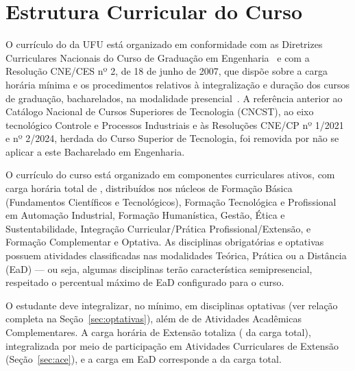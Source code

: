 \chapter{Estrutura Curricular do Curso}
\label{chp:estrutura_curricular}

O currículo do \ppccurso da UFU está organizado em conformidade com as Diretrizes Curriculares Nacionais do Curso de Graduação em Engenharia~\cite{cne_ces_2_2019,cne_ces_1_2021} e com a Resolução CNE/CES nº 2, de 18 de junho de 2007, que dispõe sobre a carga horária mínima e os procedimentos relativos à integralização e duração dos cursos de graduação, bacharelados, na modalidade presencial~\cite{cne_ces_2_2007}. A referência anterior ao Catálogo Nacional de Cursos Superiores de Tecnologia (CNCST), ao eixo tecnológico Controle e Processos Industriais e às Resoluções CNE/CP nº 1/2021 e nº 2/2024, herdada do Curso Superior de Tecnologia, foi removida por não se aplicar a este Bacharelado em Engenharia.

O currículo do curso está organizado em  componentes curriculares ativos, com carga horária total de \textbf{}, distribuídos nos núcleos de Formação Básica (Fundamentos Científicos e Tecnológicos), Formação Tecnológica e Profissional em Automação Industrial, Formação Humanística, Gestão, Ética e Sustentabilidade, Integração Curricular/Prática Profissional/Extensão, e Formação Complementar e Optativa. As disciplinas obrigatórias e optativas possuem atividades classificadas nas modalidades Teórica, Prática ou a Distância (EaD) — ou seja, algumas disciplinas terão característica semipresencial, respeitado o percentual máximo de EaD configurado para o curso.

O estudante deve integralizar, no mínimo, \textbf{} em disciplinas optativas (ver relação completa na Seção~\ref{sec:optativas}), além de \textbf{} de Atividades Acadêmicas Complementares. A carga horária de Extensão totaliza \textbf{} ( da carga total), integralizada por meio de participação em Atividades Curriculares de Extensão (Seção~\ref{sec:ace}), e a carga em EaD corresponde a  da carga total.

